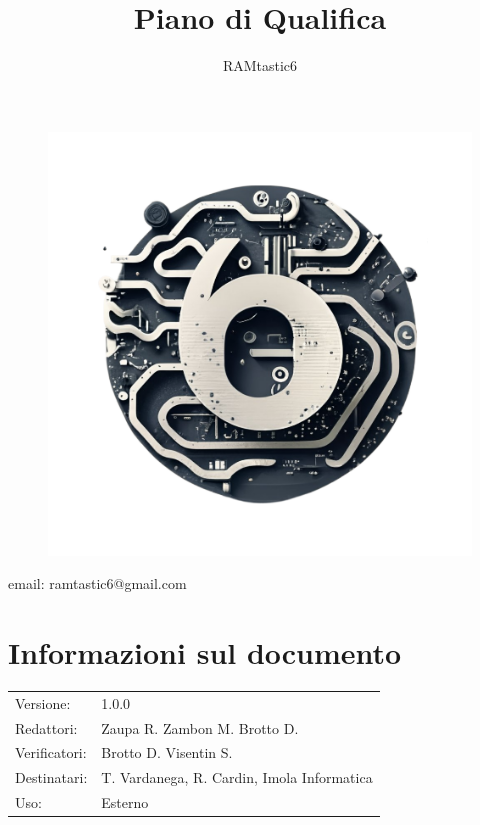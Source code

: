 \documentclass[12pt, oneside]{article}
\author{RAMtastic6}
\begin{document}
\thispagestyle{empty}
\title{Piano di Qualifica}
\maketitle
\begin{figure}[h]
  \centering
  \includegraphics[scale=0.3]{logo.png}
\end{figure}
\begin{center}
    email: ramtastic6@gmail.com
\end{center}

\section*{Informazioni sul documento}
\begin{tabular}{ll}
Versione: & 1.0.0 \\
Redattori: & Zaupa R. Zambon M. Brotto D.\\
Verificatori: & Brotto D. Visentin S.\\ 
Destinatari: & T. Vardanega, R. Cardin, Imola Informatica \\
Uso: & Esterno
\end{tabular}
\newpage

\end{document}

